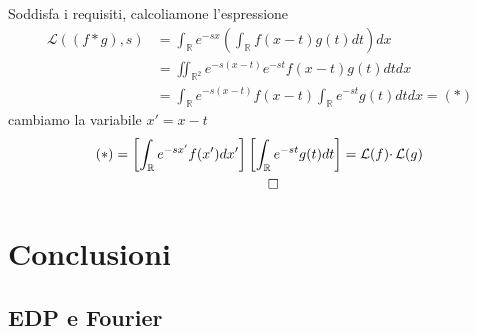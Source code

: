 \documentclass[10pt,a4paper,twoside]{book}
\begin{document}
Soddisfa i requisiti, calcoliamone l'espressione
\begin{align*}
\mathcal{L}(( f*g) ,s) & =\int _{\mathbb{R}} e^{-sx}\left(\int _{\mathbb{R}} f( x-t) g( t) dt\right) dx\\
 & =\iint _{\mathbb{R}^{2}} e^{-s( x-t)} e^{-st} f( x-t) g( t) dtdx\\
 & =\int _{\mathbb{R}} e^{-s( x-t)} f( x-t)\int _{\mathbb{R}} e^{-st} g( t) dtdx=( *)
\end{align*}
cambiamo la variabile $x'=x-t$
\begin{gather*}
( *) =\left[\int _{\mathbb{R}} e^{-sx'} f( x') dx'\right]\left[\int _{\mathbb{R}} e^{-st} g( t) dt\right] =\mathcal{L}( f) \cdotp \mathcal{L}( g)\\
\qed 
\end{gather*}
\chapter{Conclusioni}
\section{EDP e Fourier}
\end{document}
